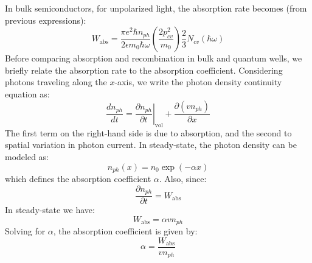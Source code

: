 In bulk semiconductors, for unpolarized light, the absorption rate becomes (from previous expressions):
\begin{equation}
	W_{\text{abs}} = \frac{\pi e^2 \hbar n_{ph}}{2 \epsilon m_0 \hbar \omega} \left( \frac{2 p_{cv}^2}{m_0} \right) \frac{2}{3} N_{cv}(\hbar \omega)
\end{equation}
Before comparing absorption and recombination in bulk and quantum wells, we briefly relate the absorption rate to the absorption coefficient. Considering photons traveling along the \(x\)-axis, we write the photon density continuity equation as:
\begin{equation}
	\frac{dn_{ph}}{dt} = \left. \frac{\partial n_{ph}}{\partial t} \right|_{\text{vol}} + \frac{\partial (v n_{ph})}{\partial x}
\end{equation}
The first term on the right-hand side is due to absorption, and the second to spatial variation in photon current. In steady-state, the photon density can be modeled as:
\begin{equation}
	n_{ph}(x) = n_0 \exp(-\alpha x)
\end{equation}
which defines the absorption coefficient \(\alpha\). Also, since:
\begin{equation}
	\frac{\partial n_{ph}}{\partial t} = W_{\text{abs}}
\end{equation}
In steady-state we have:
\begin{equation}
	W_{\text{abs}} = \alpha v n_{ph}
\end{equation}
Solving for \(\alpha\), the absorption coefficient is given by:
\begin{equation}
	\alpha = \frac{W_{\text{abs}}}{v n_{ph}}
\end{equation}
